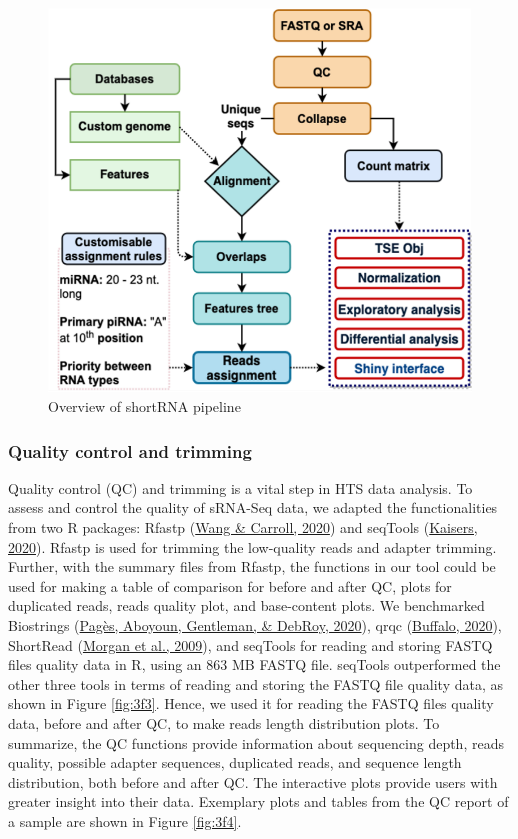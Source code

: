 \documentclass[12pt,twoside]{reedthesis}
\begin{document}
\begin{figure}[h]

{\centering \includegraphics{thesis_files/figure-latex/3f2-1} 

}

\caption{Overview of shortRNA pipeline}\label{fig:3f2}
\end{figure}
\hypertarget{quality-control-and-trimming}{%
\subsubsection{Quality control and trimming}\label{quality-control-and-trimming}}

Quality control (QC) and trimming is a vital step in HTS data analysis.
To assess and control the quality of sRNA-Seq data, we adapted the
functionalities from two R packages: Rfastp (\protect\hyperlink{ref-wang2020}{Wang \& Carroll, 2020}) and seqTools
(\protect\hyperlink{ref-kaisers2020}{Kaisers, 2020}). Rfastp is used for trimming the low-quality reads and
adapter trimming. Further, with the summary files from Rfastp, the
functions in our tool could be used for making a table of comparison for
before and after QC, plots for duplicated reads, reads quality plot, and
base-content plots. We benchmarked Biostrings (\protect\hyperlink{ref-paguxe8s2020}{Pagès, Aboyoun, Gentleman, \& DebRoy, 2020}), qrqc
(\protect\hyperlink{ref-buffalo2020}{Buffalo, 2020}), ShortRead (\protect\hyperlink{ref-morgan2009}{Morgan et al., 2009}), and seqTools for reading and
storing FASTQ files quality data in R, using an 863 MB FASTQ file.
seqTools outperformed the other three tools in terms of reading and
storing the FASTQ file quality data, as shown in Figure \ref{fig:3f3}. Hence, we
used it for reading the FASTQ files quality data, before and after QC,
to make reads length distribution plots. To summarize, the QC functions
provide information about sequencing depth, reads quality, possible
adapter sequences, duplicated reads, and sequence length distribution,
both before and after QC. The interactive plots provide users with
greater insight into their data. Exemplary plots and tables from the QC
report of a sample are shown in Figure \ref{fig:3f4}.
\end{document}
